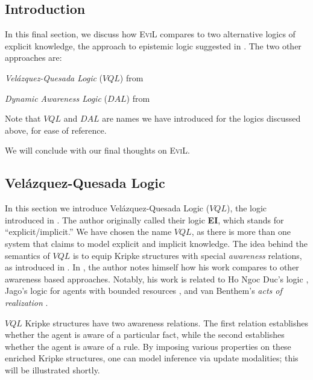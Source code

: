 \subsection{Introduction}

In this final section, we discuss how \textsc{EviL} compares to
 two alternative logics of explicit
knowledge, the approach to epistemic logic suggested in 
\cite{van_benthem_reflectionsepistemic_1991}.
The two other approaches are:
\begin{bul}
\item \emph{Vel\'{a}zquez-Quesada Logic} ($VQL$) from \cite{velzquez-quesada_inference_2009}
\item \emph{Dynamic Awareness Logic} ($DAL$)  from \cite{van_benthem_inference_2009}
\end{bul}

Note that $VQL$ and $DAL$ are names we have introduced for the logics
discussed above, for ease of reference.

We will conclude with our final thoughts on \textsc{EviL}.

\subsection{Vel\'{a}zquez-Quesada Logic}

In this section we introduce Vel\'{a}zquez-Quesada Logic ($VQL$), the
logic introduced in \cite{velzquez-quesada_inference_2009}.  The
author originally called their logic \textbf{EI}, which stands for
``explicit/implicit.''  We have chosen the name $VQL$, as there is
more than one system that claims to model explicit and implicit
knowledge.
The idea behind the semantics of 
$VQL$ is to equip Kripke structures with special 
\emph{awareness} relations, as introduced in \cite{fagin_belief_1987}.
In \cite{velzquez-quesada_inference_2009}, the author notes himself
how his work compares to other awareness based approaches.  Notably,
his work is related to Ho Ngoc Duc's logic
\cite{duc_logical_1995,duc_reasoning_1997,duc_resource-bounded_2001},
Jago's logic for agents with bounded resources
\cite{jago_logics_2006}, and van Benthem's \emph{acts of
realization} \cite{van_benthem_merging_2008}.

$VQL$ Kripke structures have two awareness relations.  
The first relation establishes whether the agent is aware of
a particular fact, while the second establishes whether the agent is
aware of a rule.  By imposing various properties on these enriched 
Kripke structures, one can model inference via update modalities; this
will be illustrated shortly.

